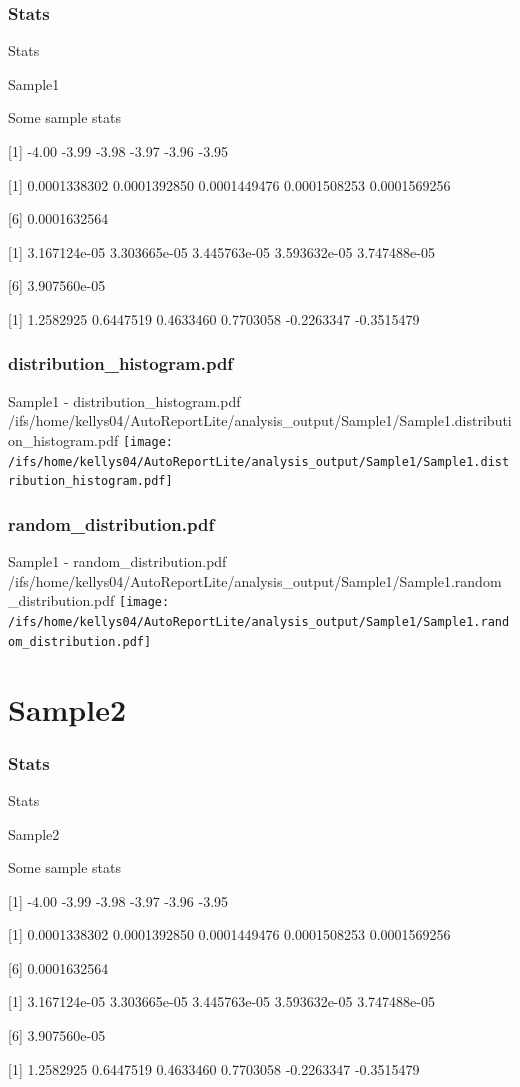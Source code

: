 \documentclass[8pt]{beamer}\usepackage[]{graphicx}\usepackage[]{color}
\begin{document}
\subsubsection{Stats}
\begin{frame}{Stats }
\small{
Sample1 

Some sample stats

[1] -4.00 -3.99 -3.98 -3.97 -3.96 -3.95

[1] 0.0001338302 0.0001392850 0.0001449476 0.0001508253 0.0001569256

[6] 0.0001632564

[1] 3.167124e-05 3.303665e-05 3.445763e-05 3.593632e-05 3.747488e-05

[6] 3.907560e-05

[1]  1.2582925  0.6447519  0.4633460  0.7703058 -0.2263347 -0.3515479
}

\end{frame}

\subsubsection{distribution\_histogram.pdf}
\begin{frame}{Sample1 - distribution\_histogram.pdf }
\scriptsize{/ifs/home/kellys04/AutoReportLite/analysis\_output/Sample1/Sample1.distribution\_histogram.pdf}
\texttt{[image: /ifs/home/kellys04/AutoReportLite/analysis\_output/Sample1/Sample1.distribution\_histogram.pdf]}
\end{frame}

\subsubsection{random\_distribution.pdf}
\begin{frame}{Sample1 - random\_distribution.pdf }
\scriptsize{/ifs/home/kellys04/AutoReportLite/analysis\_output/Sample1/Sample1.random\_distribution.pdf}
\texttt{[image: /ifs/home/kellys04/AutoReportLite/analysis\_output/Sample1/Sample1.random\_distribution.pdf]}
\end{frame}

\section{Sample2}
\subsubsection{Stats}
\begin{frame}{Stats }
\small{
Sample2 

Some sample stats

[1] -4.00 -3.99 -3.98 -3.97 -3.96 -3.95

[1] 0.0001338302 0.0001392850 0.0001449476 0.0001508253 0.0001569256

[6] 0.0001632564

[1] 3.167124e-05 3.303665e-05 3.445763e-05 3.593632e-05 3.747488e-05

[6] 3.907560e-05

[1]  1.2582925  0.6447519  0.4633460  0.7703058 -0.2263347 -0.3515479
}

\end{frame}
\end{document}
